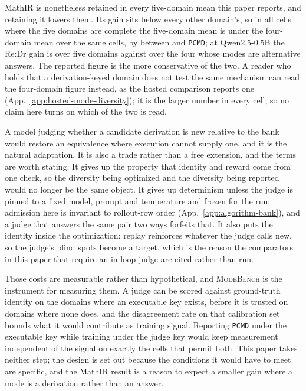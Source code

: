 \documentclass{article}
\newcommand{\1}{\mathbf 1}
\newcommand{\mb}{\textsc{ModeBench}}
\newcommand{\pmd}{\texttt{PCMD}}
\theoremstyle{remark}
\theoremstyle{definition}
\theoremstyle{plain}
\begin{document}
MathIR is nonetheless retained in every five-domain mean this paper reports,
and retaining it lowers them. Its gain sits below every other domain's, so in
all \MIRshiftcells{} cells where the five domains are complete the five-domain
mean is under the four-domain mean over the same cells, by between
\MIRshiftmin{} and \MIRshiftmax{} \pmd{}; at Qwen2.5-0.5B the Re:Dr gain is
\MIRfive{} over five domains against \MIRfour{} over the four whose modes are
alternative answers. The reported figure is the more conservative of the two.
A reader who holds that a derivation-keyed domain does not test the same
mechanism can read the four-domain figure instead, as the hosted comparison
reports one (App.~\ref{app:hosted-mode-diversity}); it is the larger number in
every cell, so no claim here turns on which of the two is read.

A model judging whether a candidate derivation is new relative to the bank
would restore an equivalence where execution cannot supply one, and it is the
natural adaptation. It is also a trade rather than a free extension, and the
terms are worth stating. It gives up the property that identity and reward
come from one check, so the diversity being optimized and the diversity being
reported would no longer be the same object. It gives up determinism unless
the judge is pinned to a fixed model, prompt and temperature and frozen for
the run; admission here is invariant to rollout-row order
(App.~\ref{app:algorithm-bank}), and a judge that answers the same pair two
ways forfeits that. It also puts the identity inside the optimization: replay
reinforces whatever the judge calls new, so the judge's blind spots become
a target, which is the reason the comparators in this paper that require an
in-loop judge are cited rather than run.

Those costs are measurable rather than hypothetical, and \mb{} is the
instrument for measuring them. A judge can be scored against ground-truth
identity on the domains where an executable key exists, before it is trusted
on domains where none does, and the disagreement rate on that calibration set
bounds what it would contribute as training signal. Reporting \pmd{} under the
executable key while training under the judge key would keep measurement
independent of the signal on exactly the cells that permit both. This paper
takes neither step; the design is set out because the conditions it would have
to meet are specific, and the MathIR result is a reason to expect a smaller
gain where a mode is a derivation rather than an answer.
\end{document}
